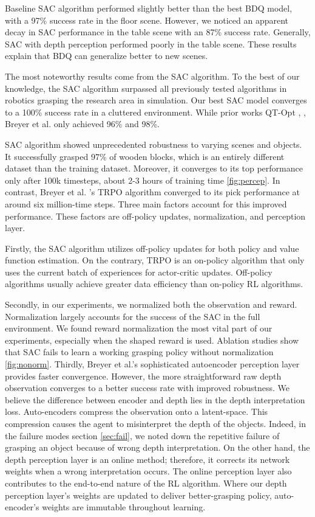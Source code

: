 Baseline SAC algorithm performed slightly better than the best BDQ model, with a 97\% success rate in the floor scene. However, we noticed an apparent decay in SAC performance in the table scene with an 87\% success rate. Generally, SAC with depth perception performed poorly in the table scene. These results explain that BDQ can generalize better to new scenes.

The most noteworthy results come from the SAC algorithm. To the best of our knowledge, the SAC algorithm surpassed all previously tested algorithms in robotics grasping the research area in simulation. Our best SAC model converges to a 100\% success rate in a cluttered environment. While prior works QT-Opt \cite{Kalashnikov2018}, \cite{Quillen2018}, Breyer et al. only achieved 96\% and 98\%. 

SAC algorithm showed unprecedented robustness to varying scenes and objects. It successfully grasped 97\% of wooden blocks, which is an entirely different dataset than the training dataset. Moreover, it converges to its top performance only after 100k timesteps, about 2-3 hours of training time \ref{fig:percep}. In contrast, Breyer et al. 's TRPO algorithm converged to its pick performance at around six million-time steps. Three main factors account for this improved performance. These factors are off-policy updates, normalization, and perception layer. 

Firstly, the SAC algorithm utilizes off-policy updates for both policy and value function estimation. On the contrary, TRPO is an on-policy algorithm that only uses the current batch of experiences for actor-critic updates. Off-policy algorithms usually achieve greater data efficiency than on-policy RL algorithms.

Secondly, in our experiments, we normalized both the observation and reward. Normalization largely accounts for the success of the SAC in the full environment. We found reward normalization the most vital part of our experiments, especially when the shaped reward is used. Ablation studies show that SAC fails to learn a working grasping policy without normalization \ref{fig:nonorm}.
Thirdly, Breyer et al.'s sophisticated autoencoder perception layer provides faster convergence. However, the more straightforward raw depth observation converges to a better success rate with improved robustness. We believe the difference between encoder and depth lies in the depth interpretation loss. Auto-encoders compress the observation onto a latent-space. This compression causes the agent to misinterpret the depth of the objects. Indeed, in the failure modes section \ref{sec:fail}, we noted down the repetitive failure of grasping an object because of wrong depth interpretation. On the other hand, the depth perception layer is an online method; therefore, it corrects its network weights when a wrong interpretation occurs. The online perception layer also contributes to the end-to-end nature of the RL algorithm. Where our depth perception layer's weights are updated to deliver better-grasping policy, auto-encoder's weights are immutable throughout learning.

